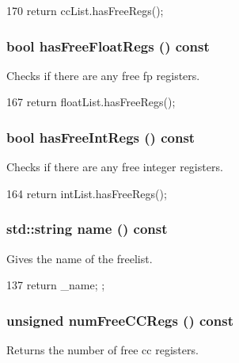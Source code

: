 \begin{DoxyCode}
170 { return ccList.hasFreeRegs(); }
\end{DoxyCode}
\hypertarget{classUnifiedFreeList_a66fd2ab82019c46855af1540971f37c5}{
\subsubsection[{hasFreeFloatRegs}]{\setlength{\rightskip}{0pt plus 5cm}bool hasFreeFloatRegs () const}}
\label{classUnifiedFreeList_a66fd2ab82019c46855af1540971f37c5}
Checks if there are any free fp registers. 


\begin{DoxyCode}
167 { return floatList.hasFreeRegs(); }
\end{DoxyCode}
\hypertarget{classUnifiedFreeList_a56543c33c7d2541d842191d68e28e7f5}{
\subsubsection[{hasFreeIntRegs}]{\setlength{\rightskip}{0pt plus 5cm}bool hasFreeIntRegs () const}}
\label{classUnifiedFreeList_a56543c33c7d2541d842191d68e28e7f5}
Checks if there are any free integer registers. 


\begin{DoxyCode}
164 { return intList.hasFreeRegs(); }
\end{DoxyCode}
\hypertarget{classUnifiedFreeList_a37627d5d5bba7f4a8690c71c2ab3cb07}{
\subsubsection[{name}]{\setlength{\rightskip}{0pt plus 5cm}std::string name () const}}
\label{classUnifiedFreeList_a37627d5d5bba7f4a8690c71c2ab3cb07}
Gives the name of the freelist. 


\begin{DoxyCode}
137 { return _name; };
\end{DoxyCode}
\hypertarget{classUnifiedFreeList_a3aea090eb5006f388c8ea56397990b85}{
\subsubsection[{numFreeCCRegs}]{\setlength{\rightskip}{0pt plus 5cm}unsigned numFreeCCRegs () const}}
\label{classUnifiedFreeList_a3aea090eb5006f388c8ea56397990b85}
Returns the number of free cc registers. 


